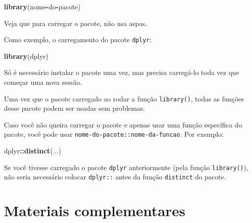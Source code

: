 \documentclass[
]{book}
\newenvironment{Shaded}{\begin{snugshade}}{\end{snugshade}}
\newcommand{\KeywordTok}[1]{\textcolor[rgb]{0.13,0.29,0.53}{\textbf{#1}}}
\newcommand{\NormalTok}[1]{#1}
\newcommand{\OperatorTok}[1]{\textcolor[rgb]{0.81,0.36,0.00}{\textbf{#1}}}
\begin{document}
\begin{Shaded}
\begin{Highlighting}[]
\KeywordTok{library}\NormalTok{(nome}\OperatorTok{-}\NormalTok{do}\OperatorTok{-}\NormalTok{pacote)}
\end{Highlighting}
\end{Shaded}

Veja que para carregar o pacote, não usa aspas.

Como exemplo, o carregamento do pacote \texttt{dplyr}:

\begin{Shaded}
\begin{Highlighting}[]
\KeywordTok{library}\NormalTok{(dplyr)}
\end{Highlighting}
\end{Shaded}

Só é necessário instalar o pacote uma vez, mas precisa carregá-lo toda vez que começar uma nova sessão.

Uma vez que o pacote carregado ao rodar a função \texttt{library()}, todas as funções desse pacote podem ser usadas sem problemas.

Caso você não queira carregar o pacote e apenas usar uma função específica do pacote, você pode usar \texttt{nome-do-pacote::nome-da-funcao}. Por exemplo:

\begin{Shaded}
\begin{Highlighting}[]
\NormalTok{dplyr}\OperatorTok{::}\KeywordTok{distinct}\NormalTok{(...)}
\end{Highlighting}
\end{Shaded}

Se você tivesse carregado o pacote \texttt{dplyr} anteriormente (pela função \texttt{library()}), não seria necessário colocar \texttt{dplyr::} antes da função \texttt{distinct} do pacote.

\hypertarget{materiais-complementares}{%
\section{Materiais complementares}\label{materiais-complementares}}
\end{document}

